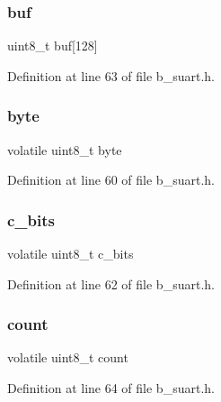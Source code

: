 \subsubsection{\texorpdfstring{buf}{buf}}
{\footnotesize\ttfamily uint8\+\_\+t buf\mbox{[}128\mbox{]}}



Definition at line 63 of file b\+\_\+suart.\+h.

\mbox{\label{struct_s___r_x_info__t_a62e96a9ecdde0ab8494d1dae9762f595}} 
\subsubsection{\texorpdfstring{byte}{byte}}
{\footnotesize\ttfamily volatile uint8\+\_\+t byte}



Definition at line 60 of file b\+\_\+suart.\+h.

\mbox{\label{struct_s___r_x_info__t_a533890957460cf4f360cf222426df810}} 
\subsubsection{\texorpdfstring{c\+\_\+bits}{c\_bits}}
{\footnotesize\ttfamily volatile uint8\+\_\+t c\+\_\+bits}



Definition at line 62 of file b\+\_\+suart.\+h.

\mbox{\label{struct_s___r_x_info__t_aef4c4f3630ede69cba8c75369a5459af}} 
\subsubsection{\texorpdfstring{count}{count}}
{\footnotesize\ttfamily volatile uint8\+\_\+t count}



Definition at line 64 of file b\+\_\+suart.\+h.

